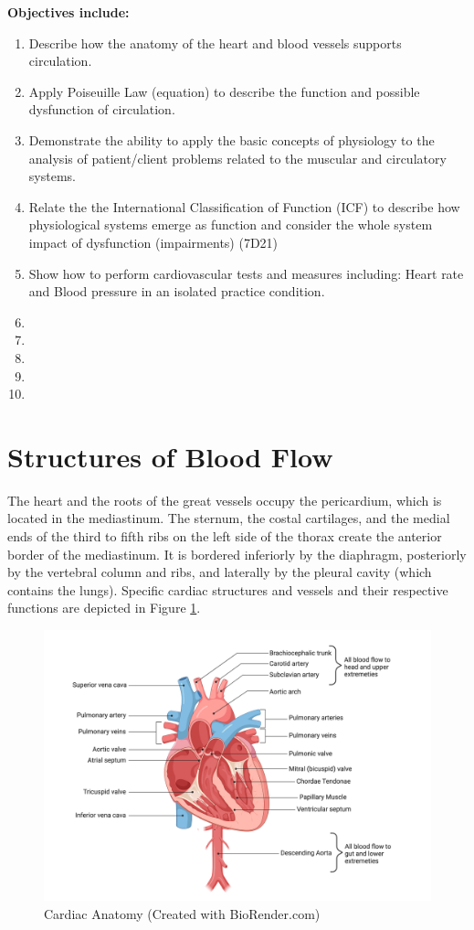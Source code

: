 \textbf{Objectives include:}
\begin{enumerate}
    \item Describe how the anatomy of the heart and blood vessels supports circulation. 
    \item Apply Poiseuille Law (equation) to describe the function and possible dysfunction of circulation.
    \item Demonstrate the ability to apply the basic concepts of physiology to the analysis of patient/client problems related to the muscular and  circulatory systems.
    \item Relate the the International Classification of Function (ICF) to describe how physiological systems emerge as function and consider the whole system impact of dysfunction (impairments) (7D21)
    \item Show how to perform cardiovascular tests and measures including: Heart rate and Blood pressure in an isolated practice condition.
    \item
    \item
    \item
    \item
    \item
\end{enumerate}

\section{Structures of Blood Flow}

The heart and the roots of the great vessels occupy the pericardium, which is located in the mediastinum. The sternum, the costal cartilages, and the medial ends of the third to fifth ribs on the left side of the thorax create the anterior border of the mediastinum. It is bordered inferiorly by the diaphragm, posteriorly by the vertebral column and ribs, and laterally by the pleural cavity (which contains the lungs). Specific cardiac structures and vessels and their respective functions are depicted in Figure \ref{fig:Cardiac_Anatomy}.

\begin{figure}[!h]
    \centering
    \includegraphics[width=1\linewidth]{./figure/Cardiac_Anatomy.png}
    \caption{Cardiac Anatomy \footnotesize{(Created with BioRender.com)}}
    \label{fig:Cardiac_Anatomy}
\end{figure}

